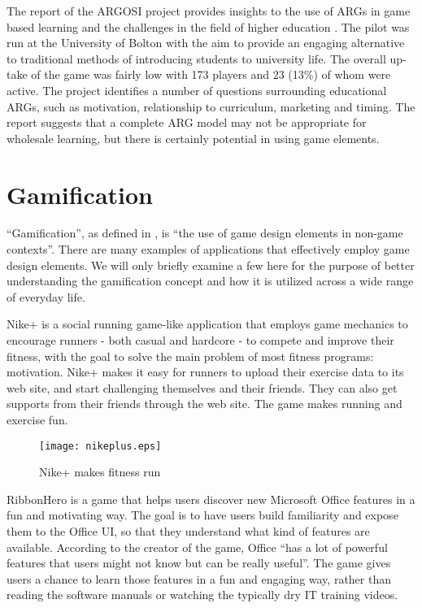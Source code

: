 The report of the ARGOSI project provides insights to the use of ARGs in game
based learning and the challenges in the field of higher education
\cite{whitton2009alternate}. The pilot was run at the University of Bolton with
the aim to provide an engaging alternative to traditional methods of
introducing students to university life. The overall up-take of the game was
fairly low with 173 players and 23 (13\%) of whom were active. The project
identifies a number of questions surrounding educational ARGs, such as
motivation, relationship to curriculum, marketing and timing. The report
suggests that a complete ARG model may not be appropriate for wholesale
learning, but there is certainly potential in using game elements.

\section{Gamification}

``Gamification'', as defined in \cite {Deterding2011mt}, is ``the use of game design elements in non-game contexts''. 
There are many examples of applications that effectively employ game design elements. We will only briefly examine a few here for the purpose of better understanding the gamification concept and how it is utilized across a wide range of everyday life. 

Nike+ \cite{nikeplus} is a social running game-like application that employs game mechanics to encourage runners - both casual and hardcore - to compete and improve their fitness, with the goal to solve the main problem of most fitness programs: motivation. Nike+ makes it easy for runners to upload their exercise data to its web site, and start challenging themselves and their friends. They can also get supports from their friends through the web site. The game makes running and exercise fun.

\begin{figure}[htbp]
	\centering
		\texttt{[image: nikeplus.eps]}
		\caption{Nike+ makes fitness run}
		\label{fig:nikeplus}
\end{figure}

RibbonHero \cite{ribbonhero} is a game that helps users discover new Microsoft Office features in a fun and motivating way. The goal is to have users build familiarity and expose them to the Office UI, so that they understand what kind of features are available. According to the creator of the game, Office ``has a lot of powerful features that users might not know but can be really useful''. The game gives users a chance to learn those features in a fun and engaging way, rather than reading the software manuals or watching the typically dry IT training videos.

